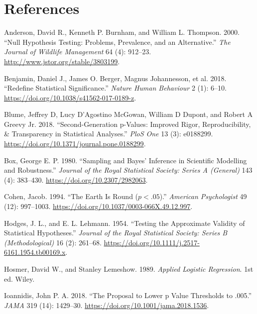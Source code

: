 \documentclass[
  11pt,
  letterpaper,
]{article}
\newlength{\cslhangindent}
\newenvironment{CSLReferences}[2] %
 {\begin{list}{}{%
  \setlength{\itemindent}{0pt}
  \setlength{\leftmargin}{0pt}
  \setlength{\parsep}{0pt}
  \ifodd #1
   \setlength{\leftmargin}{\cslhangindent}
   \setlength{\itemindent}{-1\cslhangindent}
  \fi
  \setlength{\itemsep}{#2\baselineskip}}}
 {\end{list}}
\begin{document}
\section*{References}\label{references}

\protect{}\label{refs}
\begin{CSLReferences}{1}{1}
Anderson, David R., Kenneth P. Burnham, and William L. Thompson. 2000.
{``Null Hypothesis Testing: Problems, Prevalence, and an Alternative.''}
\emph{The Journal of Wildlife Management} 64 (4): 912--23.
\url{http://www.jstor.org/stable/3803199}.

Benjamin, Daniel J., James O. Berger, Magnus Johannesson, et al. 2018.
{``Redefine Statistical Significance.''} \emph{Nature Human Behaviour} 2
(1): 6--10. \url{https://doi.org/10.1038/s41562-017-0189-z}.

Blume, Jeffrey D, Lucy D'Agostino McGowan, William D Dupont, and Robert
A Greevy Jr. 2018. {``Second-Generation p-Values: Improved Rigor,
Reproducibility, \& Transparency in Statistical Analyses.''} \emph{PloS
One} 13 (3): e0188299.
\url{https://doi.org/10.1371/journal.pone.0188299}.

Box, George E. P. 1980. {``Sampling and {Bayes}' Inference in Scientific
Modelling and Robustness.''} \emph{Journal of the Royal Statistical
Society: Series A (General)} 143 (4): 383--430.
\url{https://doi.org/10.2307/2982063}.

Cohen, Jacob. 1994. {``The Earth Is Round (\(p < .05\)).''}
\emph{American Psychologist} 49 (12): 997--1003.
\url{https://doi.org/10.1037/0003-066X.49.12.997}.

Hodges, J. L., and E. L. Lehmann. 1954. {``Testing the Approximate
Validity of Statistical Hypotheses.''} \emph{Journal of the Royal
Statistical Society: Series B (Methodological)} 16 (2): 261--68.
\url{https://doi.org/10.1111/j.2517-6161.1954.tb00169.x}.

Hosmer, David W., and Stanley Lemeshow. 1989. \emph{Applied Logistic
Regression}. 1st ed. Wiley.

Ioannidis, John P. A. 2018. {``The Proposal to Lower p Value Thresholds
to .005.''} \emph{JAMA} 319 (14): 1429--30.
\url{https://doi.org/10.1001/jama.2018.1536}.


\end{CSLReferences}
\end{document}
